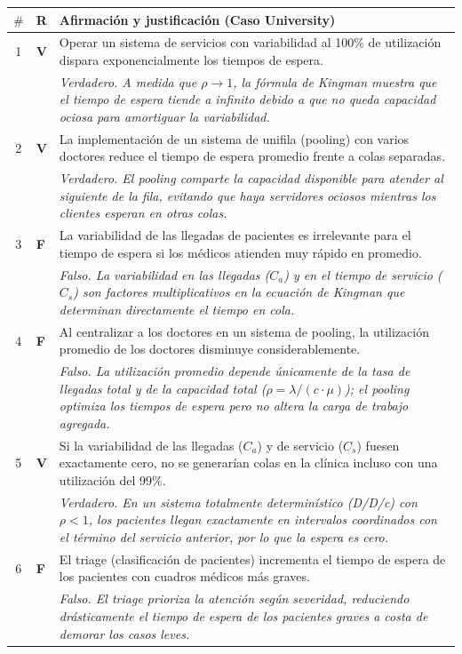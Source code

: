 \begin{center}
\small
\begin{tabular}{@{}clp{11cm}@{}}
  \toprule
  $\#$ & R & Afirmación y justificación (Caso University) \\
  \midrule
  1 & \textbf{V} & Operar un sistema de servicios con variabilidad al 100\% de utilización dispara exponencialmente los tiempos de espera. \\
    &            & \textit{Verdadero. A medida que $\rho \to 1$, la fórmula de Kingman muestra que el tiempo de espera tiende a infinito debido a que no queda capacidad ociosa para amortiguar la variabilidad.} \\
  2 & \textbf{V} & La implementación de un sistema de unifila (pooling) con varios doctores reduce el tiempo de espera promedio frente a colas separadas. \\
    &            & \textit{Verdadero. El pooling comparte la capacidad disponible para atender al siguiente de la fila, evitando que haya servidores ociosos mientras los clientes esperan en otras colas.} \\
  3 & \textbf{F} & La variabilidad de las llegadas de pacientes es irrelevante para el tiempo de espera si los médicos atienden muy rápido en promedio. \\
    &            & \textit{Falso. La variabilidad en las llegadas ($C_a$) y en el tiempo de servicio ($C_s$) son factores multiplicativos en la ecuación de Kingman que determinan directamente el tiempo en cola.} \\
  4 & \textbf{F} & Al centralizar a los doctores en un sistema de pooling, la utilización promedio de los doctores disminuye considerablemente. \\
    &            & \textit{Falso. La utilización promedio depende únicamente de la tasa de llegadas total y de la capacidad total ($\rho = \lambda / (c \cdot \mu)$); el pooling optimiza los tiempos de espera pero no altera la carga de trabajo agregada.} \\
  5 & \textbf{V} & Si la variabilidad de las llegadas ($C_a$) y de servicio ($C_s$) fuesen exactamente cero, no se generarían colas en la clínica incluso con una utilización del 99\%. \\
    &            & \textit{Verdadero. En un sistema totalmente determinístico (D/D/c) con $\rho < 1$, los pacientes llegan exactamente en intervalos coordinados con el término del servicio anterior, por lo que la espera es cero.} \\
  6 & \textbf{F} & El triage (clasificación de pacientes) incrementa el tiempo de espera de los pacientes con cuadros médicos más graves. \\
    &            & \textit{Falso. El triage prioriza la atención según severidad, reduciendo drásticamente el tiempo de espera de los pacientes graves a costa de demorar los casos leves.} \\
  \bottomrule
\end{tabular}
\end{center}

